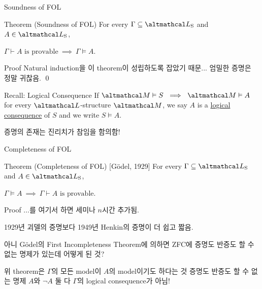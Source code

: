\documentclass[../231120_msquare_computational-logic.tex]{subfiles}
\begin{document}
\begin{frame}{Soundness of FOL}
    \begin{block}{Theorem (Soundness of FOL)}
        For every \(\Gamma \subseteq \LS\) and \(A \in \LS\),
        \centerline{\(\Gamma \vdash A \text{ is provable} \ \implies\ \Gamma \vDash A\).}
    \end{block}
    \begin{block}{Proof}
        Natural induction을 이 theorem이 성립하도록 잡았기 때문...
        엄밀한 증명은 정말 귀찮음. \qed
    \end{block}
    \begin{exampleblock}{Recall: Logical Consequence}
        If \(\mcal M \vDash S \ \implies\ \mcal M \vDash A\) for every \(\Lang\)-structure \(\mcal M\),
        we say \(A\) is a \ul{logical consequence} of \(S\)
        and we write \(S \vDash A\).
    \end{exampleblock}

    \begin{alertblock}{}
        \centerline{증명의 존재는 진리치가 참임을 함의함!}
    \end{alertblock}
\end{frame}

\begin{frame}{Completeness of FOL}
    \begin{block}{Theorem (Completeness of FOL) \hfill [Gödel, 1929]}
        For every \(\Gamma \subseteq \LS\) and \(A \in \LS\),
        \centerline{\(\Gamma \vDash A\ \implies\ \Gamma \vdash A \text{ is provable} \).}
    \end{block}
    \begin{block}{Proof}
        \pause
        ...를 여기서 하면 세미나 \(n\)시간 추가됨.
        \begin{itemize}
            \ii 1929년 괴델의 증명보다 1949년 Henkin의 증명이 더 쉽고 짧음.
        \end{itemize}
    \end{block}
    \begin{alertblock}{}
        아니 Gödel의 First Incompleteness Theorem에 의하면
        ZFC에 증명도 반증도 할 수 없는 명제가 있는데 어떻게 된 것? \pause
        \begin{itemize}
            \ii 위 theorem은 \(\Gamma\)의 모든 model이 \(A\)의 model이기도 하다는 것
            \ii 증명도 반증도 할 수 없는 명제 \(A\)와 \(\lnot A\) 둘 다 \(\Gamma\)의 logical consequence가 아님!
        \end{itemize}
    \end{alertblock}
\end{frame}
\end{document}
